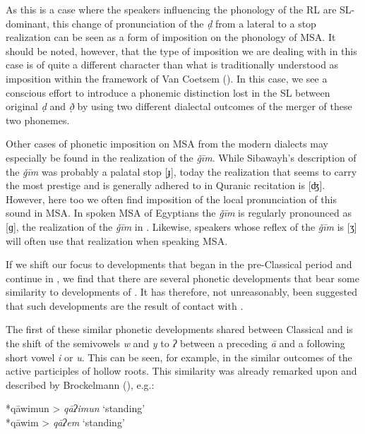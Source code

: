 \documentclass[output=paper]{langsci/langscibook}
\begin{document}
As this is a case where the speakers influencing the phonology of the {RL} are SL-dominant, this change of pronunciation of the \textit{ḍ} from a lateral to a stop realization can be seen as a form of {imposition} on the phonology of MSA. It should be noted, however, that the type of {imposition} we are dealing with in this case is of quite a different character than what is traditionally understood as {imposition} within the framework of Van Coetsem (\citeyear{VanCoetsem1988,VanCoetsem2000}). In this case, we see a conscious effort to introduce a phonemic distinction lost in the {SL} between original \textit{ḍ} and \textit{ð̣} by using two different dialectal outcomes of the {merger} of these two phonemes.

Other cases of phonetic {imposition} on MSA from the modern dialects may especially be found in the realization of the \textit{ǧīm}. While Sibawayh’s description of the \textit{ǧīm} was probably a palatal stop [ɟ], today the realization that seems to carry the most {prestige} and is generally adhered to in Quranic recitation is [ʤ]. However, here too we often find {imposition} of the local pronunciation of this sound in MSA. In spoken MSA of Egyptians the \textit{ǧīm} is regularly pronounced as [ɡ], the realization of the \textit{ǧīm} in . Likewise,   speakers whose reflex of the \textit{ǧīm} is [ʒ] will often use that realization when speaking MSA.

If we shift our focus to developments that began in the pre-Classical period and continue in , we find that there are several phonetic developments that bear some similarity to developments of . It has therefore, not unreasonably, been suggested that such developments are the result of contact with .

The first of these similar phonetic developments shared between Classical  and  is the shift of the semivowels  \textit{w} and \textit{y} to \textit{ʔ} between a preceding \textit{ā} and a following short vowel \textit{i} or \textit{u}. This can be seen, for example, in the similar outcomes of the active participles of hollow {roots}. This similarity was already remarked upon and described by Brockelmann (\citeyear[138--139]{Brockelmann1908}), e.g.:

\ea
\ea {} *qāwimun > \textit{qāʔimun} ‘standing’\\
\ex {} *qāwim > \textit{qāʔem} ‘standing’
\z
\z
\end{document}
